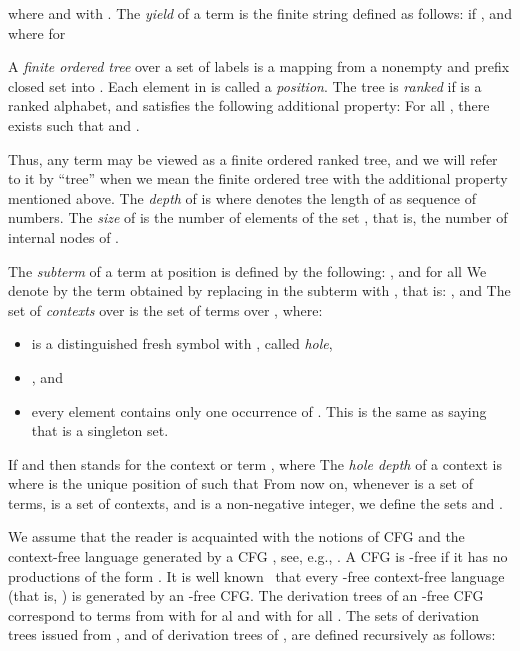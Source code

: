 \documentclass[preprint,12pt,english]{article}
\newcommand\comment[1]{}
\begin{document}
where  and  with . The {\em yield} of a term  is the finite string  defined as follows:  if , and  where  for 

A {\em finite ordered tree} over a set of labels  is a mapping  from a nonempty and prefix closed set  into . Each element in  is called a {\em position}. The tree  is {\em ranked} if  is a ranked alphabet, and  satisfies the following additional property:
For all , there exists  such that   and  .

Thus, any term  may be viewed as a finite ordered ranked tree, and we will  refer to it by ``tree'' when we mean the finite ordered tree with the additional property mentioned above. The {\em depth} of  is  where  denotes the length of  as sequence of numbers. The {\em size}  of   is the number of elements of the set , that is, the number of internal nodes of .

The {\em subterm}  of a term  at position  is defined by the following: , and  for all  
We denote by  the term obtained by replacing in  the subterm  with , that is: , and 
The set  of {\em contexts} over  is the set of terms  over , where:
\begin{itemize}
\item  is a distinguished fresh symbol with , called {\em hole},
\item , and 
\item every element  contains only one occurrence of . This is the same as saying that  is a singleton set. 
\end{itemize}
If  and  then  stands for the context or term , where  The {\em hole depth} of a context  is  where  is the unique position of  such that  
From now on, whenever  is a set of terms,  is a set of contexts, and  is a non-negative integer, we define the sets
 and .

\comment{
A {\em context-free grammar} (CFG) is a quadruple  where:  is a finite set of {\em nonterminals};  is a finite set of {\em terminals};  is a finite set of {\em productions}   with  and ; and  is a special nonterminal called the {\em start symbol}.  Such a CFG induces a {\em derivation relation}  on the set of finite strings , defined by  whenever   and  The {\em language generated} by  is , where  is the reflexive and transitive closure of . A {\em context-free language} is a language generated by a CFG.}
We assume that the reader is acquainted with the notions of CFG and the context-free language  generated by a CFG , see, e.g., \cite{Sipser:2006}.
A CFG is -free if it has no productions of the form . It is well known~\cite{Hopcroft:2003} that every -free context-free language  (that is, ) is generated by an -free CFG. 
The derivation trees of an -free CFG   correspond to terms from  with  for al  and  with  for all . The sets  of derivation trees  issued from , and  of derivation trees of , are defined recursively as follows:
\end{document}
